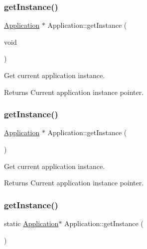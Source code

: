 \subsubsection{\texorpdfstring{get\+Instance()}{getInstance()}\hspace{0.1cm}{\footnotesize\ttfamily [5/12]}}
{\footnotesize\ttfamily \hyperlink{classApplication}{Application} $\ast$ Application\+::get\+Instance (\begin{DoxyParamCaption}\item[{void}]{ }\end{DoxyParamCaption})\hspace{0.3cm}{\ttfamily [static]}}



Get current application instance. 

\begin{DoxyReturn}{Returns}
Current application instance pointer. 
\end{DoxyReturn}
\mbox{\label{classApplication_a723b8bba6edce3769a8d771770ca10e1}} 
\subsubsection{\texorpdfstring{get\+Instance()}{getInstance()}\hspace{0.1cm}{\footnotesize\ttfamily [6/12]}}
{\footnotesize\ttfamily \hyperlink{classApplication}{Application} $\ast$ Application\+::get\+Instance (\begin{DoxyParamCaption}{ }\end{DoxyParamCaption})\hspace{0.3cm}{\ttfamily [static]}}



Get current application instance. 

\begin{DoxyReturn}{Returns}
Current application instance pointer. 
\end{DoxyReturn}
\mbox{\label{classApplication_ab5dba709d2e806d5d83c297bab6cdace}} 
\subsubsection{\texorpdfstring{get\+Instance()}{getInstance()}\hspace{0.1cm}{\footnotesize\ttfamily [7/12]}}
{\footnotesize\ttfamily static \hyperlink{classApplication}{Application}$\ast$ Application\+::get\+Instance (\begin{DoxyParamCaption}{ }\end{DoxyParamCaption})\hspace{0.3cm}{\ttfamily [static]}}




